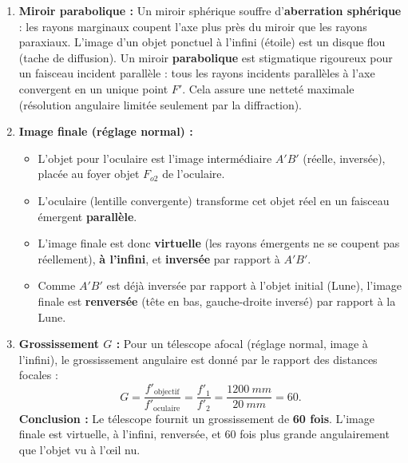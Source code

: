 \documentclass[11pt]{article}
\begin{document}
\begin{exoresolu}
\begin{enumerate}
\begin{itemize}
    \end{itemize}
    \item \textbf{Miroir parabolique :} Un miroir sphérique souffre d'\textbf{aberration sphérique} : les rayons marginaux coupent l'axe plus près du miroir que les rayons paraxiaux. L'image d'un objet ponctuel à l'infini (étoile) est un disque flou (tache de diffusion). Un miroir \textbf{parabolique} est stigmatique rigoureux pour un faisceau incident parallèle : tous les rayons incidents parallèles à l'axe convergent en un unique point $F'$. Cela assure une netteté maximale (résolution angulaire limitée seulement par la diffraction).
    \item \textbf{Image finale (réglage normal) :}
    \begin{itemize}
        \item L'objet pour l'oculaire est l'image intermédiaire $A'B'$ (réelle, inversée), placée au foyer objet $F_{o2}$ de l'oculaire.
        \item L'oculaire (lentille convergente) transforme cet objet réel en un faisceau émergent \textbf{parallèle}.
        \item L'image finale est donc \textbf{virtuelle} (les rayons émergents ne se coupent pas réellement), \textbf{à l'infini}, et \textbf{inversée} par rapport à $A'B'$.
        \item Comme $A'B'$ est déjà inversée par rapport à l'objet initial (Lune), l'image finale est \textbf{renversée} (tête en bas, gauche-droite inversé) par rapport à la Lune.
    \end{itemize}
    \item \textbf{Grossissement $G$ :} Pour un télescope afocal (réglage normal, image à l'infini), le grossissement angulaire est donné par le rapport des distances focales :
    \[
    G = \frac{f'_{\text{objectif}}}{f'_{\text{oculaire}}} = \frac{f'_1}{f'_2} = \frac{\SI{1200}{mm}}{\SI{20}{mm}} = 60.
    \]
    \textbf{Conclusion :} Le télescope fournit un grossissement de \textbf{60 fois}. L'image finale est virtuelle, à l'infini, renversée, et 60 fois plus grande angulairement que l'objet vu à l'œil nu.
\end{enumerate}
\end{exoresolu}
\end{document}
